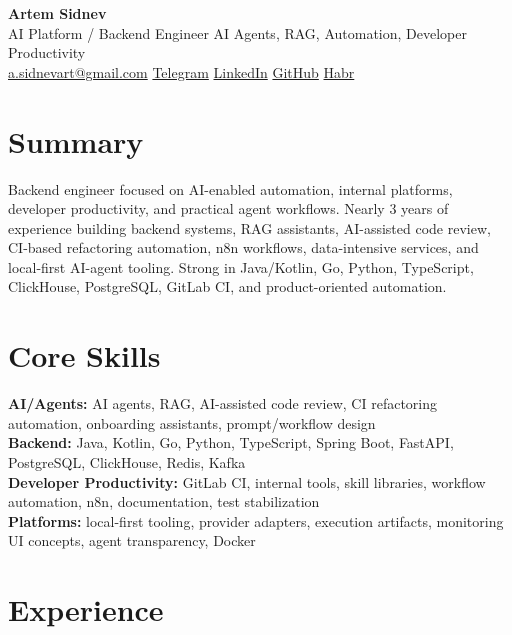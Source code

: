 \documentclass[10pt,a4paper]{article}
\begin{document}
\small

\begin{center}
{\LARGE \textbf{Artem Sidnev}}\\[0.18em]
{\normalsize AI Platform / Backend Engineer \textbar{} AI Agents, RAG, Automation, Developer Productivity}\\[0.32em]
{\footnotesize
\href{mailto:a.sidnevart@gmail.com}{a.sidnevart@gmail.com}
\enspace\textbar\enspace
\href{https://t.me/sidnevart}{Telegram}
\enspace\textbar\enspace
\href{https://www.linkedin.com/in/artem-sidnev}{LinkedIn}
\enspace\textbar\enspace
\href{https://github.com/sidnevart}{GitHub}
\enspace\textbar\enspace
\href{https://habr.com/ru/users/sidnevart/}{Habr}
}
\end{center}

\section*{Summary}
Backend engineer focused on AI-enabled automation, internal platforms, developer productivity, and practical agent workflows. Nearly 3 years of experience building backend systems, RAG assistants, AI-assisted code review, CI-based refactoring automation, n8n workflows, data-intensive services, and local-first AI-agent tooling. Strong in Java/Kotlin, Go, Python, TypeScript, ClickHouse, PostgreSQL, GitLab CI, and product-oriented automation.

\section*{Core Skills}
\textbf{AI/Agents:} AI agents, RAG, AI-assisted code review, CI refactoring automation, onboarding assistants, prompt/workflow design \\
\textbf{Backend:} Java, Kotlin, Go, Python, TypeScript, Spring Boot, FastAPI, PostgreSQL, ClickHouse, Redis, Kafka \\
\textbf{Developer Productivity:} GitLab CI, internal tools, skill libraries, workflow automation, n8n, documentation, test stabilization \\
\textbf{Platforms:} local-first tooling, provider adapters, execution artifacts, monitoring UI concepts, agent transparency, Docker

\section*{Experience}
\end{document}
